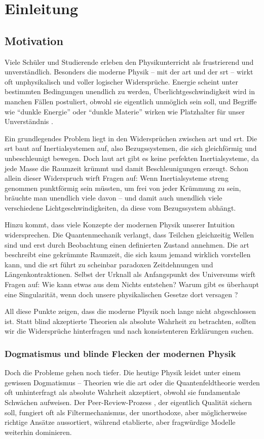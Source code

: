 \chapter{Einleitung}
\section{Motivation}
Viele Schüler und Studierende erleben den Physikunterricht als frustrierend und unverständlich. Besonders die moderne Physik – mit der \gls{art}
und der \gls{srt} – wirkt oft unphysikalisch und voller logischer Widersprüche. Energie scheint unter bestimmten Bedingungen unendlich zu werden,
Überlichtgeschwindigkeit wird in manchen Fällen postuliert, obwohl sie eigentlich unmöglich sein soll, und Begriffe wie \enquote{dunkle Energie} oder \enquote{dunkle Materie} wirken wie
Platzhalter für unser Unverständnis \cite{Milgrom2015}.

Ein grundlegendes Problem liegt in den Widersprüchen zwischen \gls{art} und \gls{srt}. Die \gls{srt} baut auf Inertialsystemen auf, also Bezugssystemen, die sich gleichförmig und unbeschleunigt
bewegen. Doch laut \gls{art} gibt es keine perfekten Inertialsysteme, da jede Masse die Raumzeit krümmt und damit Beschleunigungen erzeugt. Schon allein dieser Widerspruch wirft
Fragen auf: Wenn Inertialsysteme streng genommen punktförmig sein müssten, um frei von jeder Krümmung zu sein, bräuchte man unendlich viele davon – und damit auch unendlich
viele verschiedene Lichtgeschwindigkeiten, da diese vom Bezugssystem abhängt.

Hinzu kommt, dass viele Konzepte der modernen Physik unserer Intuition widersprechen. Die Quantenmechanik verlangt, dass Teilchen gleichzeitig Wellen sind und erst durch
Beobachtung einen definierten Zustand annehmen. Die \gls{art} beschreibt eine gekrümmte Raumzeit, die sich kaum jemand wirklich vorstellen kann, und die \gls{srt} führt zu scheinbar
paradoxen Zeitdehnungen und Längenkontraktionen. Selbst der Urknall als Anfangspunkt des Universums wirft Fragen auf: Wie kann etwas aus dem Nichts entstehen? Warum gibt es
überhaupt eine Singularität, wenn doch unsere physikalischen Gesetze dort versagen \cite{Lerner2018}?

All diese Punkte zeigen, dass die moderne Physik noch lange nicht abgeschlossen ist. Statt blind akzeptierte Theorien als absolute Wahrheit zu betrachten, sollten wir die
Widersprüche hinterfragen und nach konsistenteren Erklärungen suchen.

\subsection{Dogmatismus und blinde Flecken der modernen Physik}
Doch die Probleme gehen noch tiefer. Die heutige Physik leidet unter einem gewissen Dogmatismus – Theorien wie die \gls{art} oder die Quantenfeldtheorie werden oft unhinterfragt
als absolute Wahrheit akzeptiert, obwohl sie fundamentale Schwächen aufweisen. Der Peer-Review-Prozess \cite{Chalmers2013}, der eigentlich Qualität sichern soll, fungiert oft als Filtermechanismus,
der unorthodoxe, aber möglicherweise richtige Ansätze aussortiert, während etablierte, aber fragwürdige Modelle weiterhin dominieren.

